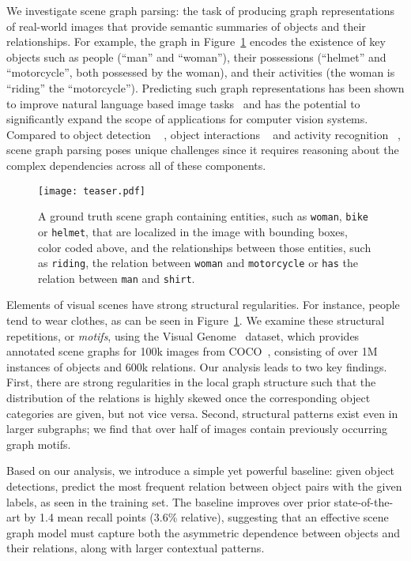 We investigate scene graph parsing: the task of producing graph representations of real-world images that provide semantic summaries of objects and their relationships.
For example, the graph in Figure~\ref{fig:teaser} encodes the existence of key objects such as people (``man'' and ``woman''), their possessions (``helmet'' and ``motorcycle'', both possessed by the woman), and their activities (the woman is ``riding'' the ``motorcycle'').
Predicting such graph representations has been shown to improve natural language based image tasks~\cite{johnson_image_2015,Teney2016GraphStructuredRF,Yin2017Obj2TextGV} and has the potential to significantly expand the scope of applications for computer vision systems.
Compared to object detection ~\cite{ren_faster_2015, redmon_yolo9000:_2016} , object interactions ~\cite{yao2010modeling,chao:iccv2015} and activity recognition ~\cite{2014survey}, scene graph parsing poses unique challenges since it requires reasoning about the complex dependencies across all of these components.

\begin{figure}
    \centering
    \texttt{[image: teaser.pdf]}
    \caption{A ground truth scene graph containing entities, such as \texttt{woman}, \texttt{bike} or \texttt{helmet}, that are localized in the image with bounding boxes, color coded above, and the relationships between those entities, such as \texttt{riding}, the relation between \texttt{woman} and \texttt{motorcycle} or \texttt{has} the relation between \texttt{man} and \texttt{shirt}.
    }
    \label{fig:teaser}
\end{figure}

Elements of visual scenes have strong structural regularities.
For instance, people tend to wear clothes, as can be seen in Figure~\ref{fig:teaser}.
We examine these structural repetitions, or \emph{motifs}, using the Visual Genome~\cite{visualgenome} dataset, which provides annotated scene graphs for 100k images from COCO~\cite{mscoco}, consisting of over 1M instances of objects and 600k relations.
Our analysis leads to two key findings.
First, there are strong regularities in the local graph structure such that
the distribution of the relations is highly skewed once the corresponding object categories are given, but not vice versa.
Second, structural patterns exist even in larger
subgraphs; we find that over half of images contain previously occurring graph motifs. 

Based on our analysis, we introduce a simple yet powerful baseline: given object detections, predict the most frequent relation between object pairs with the given labels, as seen in the training set.
The baseline improves over prior state-of-the-art by 1.4 mean recall points (3.6\% relative), suggesting that an effective scene graph model must capture both the asymmetric dependence between objects and their relations, along with larger contextual patterns.

